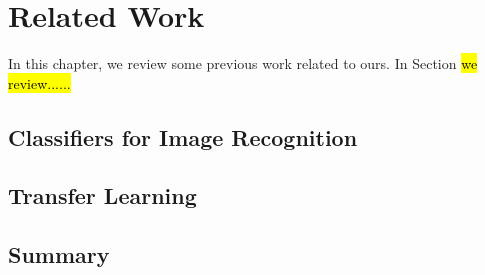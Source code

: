 \chapter{Related Work}
In this chapter, we review some previous work related to ours. In Section \hl{we review......}
\section{Classifiers for Image Recognition}\label{sec:relat:linear}

\section{Transfer Learning}

\section{Summary}